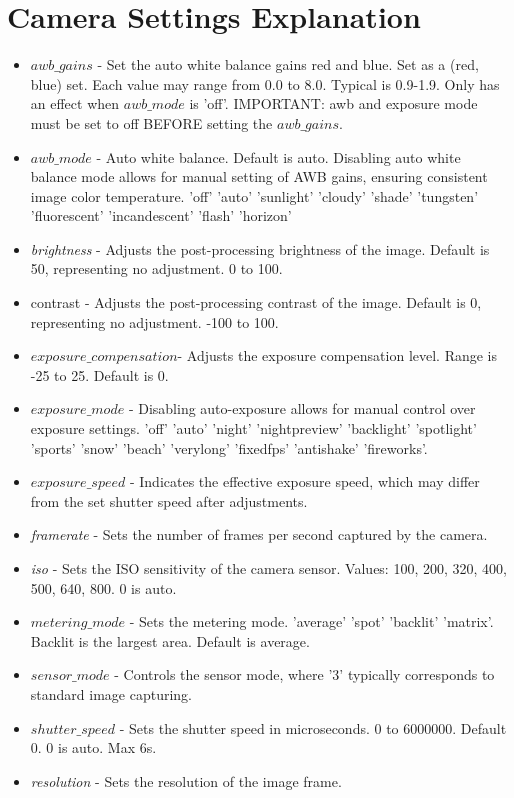 \section{Camera Settings Explanation}
\label{app:camera_settings_explanation}
\begin{itemize}
	\item $awb\_gains$ - Set the auto white balance gains red and blue. Set as a (red, blue) set. Each value may range from 0.0 to 8.0. Typical is 0.9-1.9. Only has an effect when $awb\_mode$ is 'off'. IMPORTANT: awb and exposure mode must be set to off BEFORE setting the $awb\_gains$.
	\item $awb\_mode$ - Auto white balance. Default is auto. Disabling auto white balance mode allows for manual setting of AWB gains, ensuring consistent image color temperature. 'off' 'auto' 'sunlight' 'cloudy' 'shade' 'tungsten' 'fluorescent' 'incandescent' 'flash' 'horizon'
	\item \textit{brightness} - Adjusts the post-processing brightness of the image. Default is 50, representing no adjustment. 0 to 100.
	\item contrast - Adjusts the post-processing contrast of the image. Default is 0, representing no adjustment. -100 to 100.
	\item $exposure\_compensation$- Adjusts the exposure compensation level. Range is -25 to 25. Default is 0.
	\item $exposure\_mode$ - Disabling auto-exposure allows for manual control over exposure settings. 'off' 'auto' 'night' 'nightpreview' 'backlight' 'spotlight' 'sports' 'snow' 'beach' 'verylong' 'fixedfps' 'antishake' 'fireworks'.
	\item $exposure\_speed$ - Indicates the effective exposure speed, which may differ from the set shutter speed after adjustments.
	\item \textit{framerate} - Sets the number of frames per second captured by the camera.
	\item \textit{iso} - Sets the ISO sensitivity of the camera sensor. Values: 100, 200, 320, 400, 500, 640, 800. 0 is auto.
	\item $metering\_mode$ - Sets the metering mode. 'average' 'spot' 'backlit' 'matrix'. Backlit is the largest area. Default is average.
	\item $sensor\_mode$ - Controls the sensor mode, where '3' typically corresponds to standard image capturing.
	\item $shutter\_speed$ - Sets the shutter speed in microseconds. 0 to 6000000. Default 0. 0 is auto. Max 6s.
	\item \textit{resolution} - Sets the resolution of the image frame.
\end{itemize}